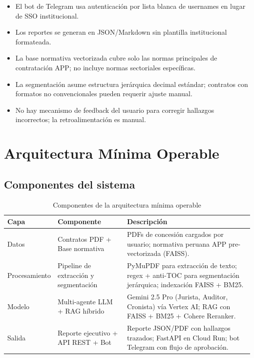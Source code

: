 \begin{itemize}
    \item El bot de Telegram usa autenticación por lista blanca de
    usernames en lugar de SSO institucional.
    \item Los reportes se generan en JSON/Markdown sin plantilla
    institucional formateada.
    \item La base normativa vectorizada cubre solo las normas principales
    de contratación APP; no incluye normas sectoriales específicas.
    \item La segmentación asume estructura jerárquica decimal estándar;
    contratos con formatos no convencionales pueden requerir ajuste manual.
    \item No hay mecanismo de feedback del usuario para corregir hallazgos
    incorrectos; la retroalimentación es manual.
\end{itemize}

\section{Arquitectura Mínima Operable}

\subsection{Componentes del sistema}

\begin{table}[H]
\centering
\caption{Componentes de la arquitectura mínima operable}
\label{tab:arquitectura_mvp}
\begin{tabular}{p{2.8cm} p{4cm} p{6cm}}
\toprule
\textbf{Capa} & \textbf{Componente} & \textbf{Descripción} \\
\midrule
Datos &
  Contratos PDF + Base normativa &
  PDFs de concesión cargados por usuario; normativa peruana APP
  pre-vectorizada (FAISS). \\
\addlinespace
Procesamiento &
  Pipeline de extracción y segmentación &
  PyMuPDF para extracción de texto; regex + anti-TOC para segmentación
  jerárquica; indexación FAISS + BM25. \\
\addlinespace
Modelo &
  Multi-agente LLM + RAG híbrido &
  Gemini 2.5 Pro (Jurista, Auditor, Cronista) vía Vertex AI;
  RAG con FAISS + BM25 + Cohere Reranker. \\
\addlinespace
Salida &
  Reporte ejecutivo + API REST + Bot &
  Reporte JSON/PDF con hallazgos trazados; FastAPI en Cloud Run;
  bot Telegram con flujo de aprobación. \\
\bottomrule
\end{tabular}
\end{table}

